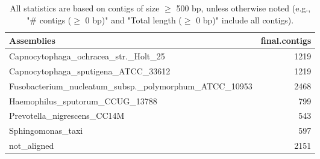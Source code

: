 \documentclass[12pt,a4paper]{article}
\begin{document}
\begin{table}[ht]
\begin{center}
\caption{All statistics are based on contigs of size $\geq$ 500 bp, unless otherwise noted (e.g., "\# contigs ($\geq$ 0 bp)" and "Total length ($\geq$ 0 bp)" include all contigs).}
\begin{tabular}{|l*{1}{|r}|}
\hline
Assemblies & final.contigs \\ \hline
Capnocytophaga\_ochracea\_str.\_Holt\_25 & 1219 \\ \hline
Capnocytophaga\_sputigena\_ATCC\_33612 & 1219 \\ \hline
Fusobacterium\_nucleatum\_subsp.\_polymorphum\_ATCC\_10953 & 2468 \\ \hline
Haemophilus\_sputorum\_CCUG\_13788 & 799 \\ \hline
Prevotella\_nigrescens\_CC14M & 543 \\ \hline
Sphingomonas\_taxi & 597 \\ \hline
not\_aligned & 2151 \\ \hline
\end{tabular}
\end{center}
\end{table}
\end{document}
